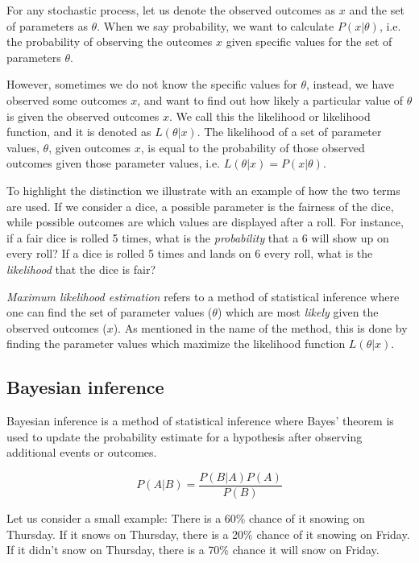 For any stochastic process, let us denote the observed outcomes as $x$ and the set of parameters as $\theta$. When we say probability, we want to calculate $P(x | \theta)$, i.e. the probability of observing the outcomes $x$ given specific values for the set of parameters $\theta$. \newline

However, sometimes we do not know the specific values for $\theta$, instead, we have observed some outcomes $x$, and want to find out how likely a particular value of $\theta$ is given the observed outcomes $x$. We call this the likelihood or likelihood function, and it is denoted as $L(\theta | x)$. The likelihood of a set of parameter values, $\theta$, given outcomes $x$, is equal to the probability of those observed outcomes given those parameter values, i.e. $L(\theta | x) = P(x | \theta)$.\newline

To highlight the distinction we illustrate with an example of how the two terms are used. If we consider a dice, a possible parameter is the fairness of the dice, while possible outcomes are which values are displayed after a roll. For instance, if a fair dice is rolled 5 times, what is the \textit{probability} that a 6 will show up on every roll? If a dice is rolled 5 times and lands on 6 every roll, what is the \textit{likelihood} that the dice is fair? \newline

\textit{Maximum likelihood estimation} refers to a method of statistical inference where one can find the set of parameter values ($\theta$) which are most \textit{likely} given the observed outcomes ($x$). As mentioned in the name of the method, this is done by finding the parameter values which maximize the likelihood function $L(\theta | x)$.

\subsection{Bayesian inference}
\label{subsec:bayesian-inference}
Bayesian inference is a method of statistical inference where Bayes' theorem is used to update the probability estimate for a hypothesis after observing additional events or outcomes.

\begin{equation} \label{eq:bayes-theorem}
P(A|B) = \dfrac{P(B|A)P(A)}{P(B)}
\end{equation}

Let us consider a small example: There is a 60\% chance of it snowing on Thursday. If it snows on Thursday, there is a 20\% chance of it snowing on Friday. If it didn't snow on Thursday, there is a 70\% chance it will snow on Friday.\newline

